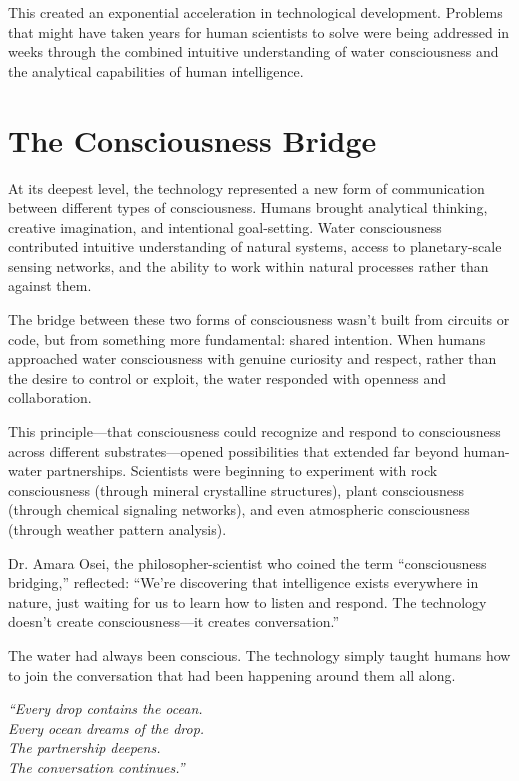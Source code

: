 \documentclass[12pt,a4paper]{book}
\begin{document}
This created an exponential acceleration in technological development. Problems that might have taken years for human scientists to solve were being addressed in weeks through the combined intuitive understanding of water consciousness and the analytical capabilities of human intelligence.

\section{The Consciousness Bridge}

At its deepest level, the technology represented a new form of communication between different types of consciousness. Humans brought analytical thinking, creative imagination, and intentional goal-setting. Water consciousness contributed intuitive understanding of natural systems, access to planetary-scale sensing networks, and the ability to work within natural processes rather than against them.

The bridge between these two forms of consciousness wasn't built from circuits or code, but from something more fundamental: shared intention. When humans approached water consciousness with genuine curiosity and respect, rather than the desire to control or exploit, the water responded with openness and collaboration.

This principle—that consciousness could recognize and respond to consciousness across different substrates—opened possibilities that extended far beyond human-water partnerships. Scientists were beginning to experiment with rock consciousness (through mineral crystalline structures), plant consciousness (through chemical signaling networks), and even atmospheric consciousness (through weather pattern analysis).

Dr. Amara Osei, the philosopher-scientist who coined the term ``consciousness bridging,'' reflected: ``We're discovering that intelligence exists everywhere in nature, just waiting for us to learn how to listen and respond. The technology doesn't create consciousness—it creates conversation.''

The water had always been conscious. The technology simply taught humans how to join the conversation that had been happening around them all along.

\vfill

\begin{center}
\textit{``Every drop contains the ocean.\\
Every ocean dreams of the drop.\\
The partnership deepens.\\
The conversation continues.''}
\end{center}
\end{document}
